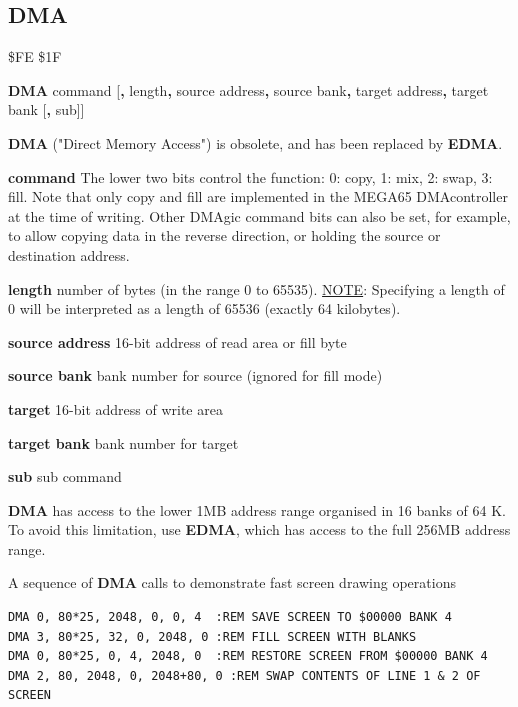 \subsection{DMA}
\label{BASIC 65 Commands!DMA}
\begin{description}[leftmargin=2cm,style=nextline]
\item [Token:] \$FE \$1F
\item [Format:] {\bf DMA} command [{\bf,} length{\bf,} source address{\bf,}
                 source bank{\bf,} target address{\bf,} target bank
                 [{\bf,} sub]]
\item [Usage:]
   {\bf DMA} ("Direct Memory Access") is obsolete,
   and has been replaced by {\bf EDMA}.

   {\bf command} The lower two bits control the function: 0: copy, 1: mix, 2: swap, 3: fill. Note that only copy and fill are implemented in the MEGA65 DMAcontroller at the time of writing.  Other DMAgic command bits can also be set, for example, to allow copying data in the reverse direction, or holding the source or destination address.

   {\bf length} number of bytes (in the range 0 to 65535). \underline{NOTE}: Specifying a length of 0 will be interpreted as a length of 65536 (exactly 64 kilobytes).

   {\bf source address} 16-bit address of read area or fill byte

   {\bf source bank} bank number for source (ignored for fill mode)

   {\bf target} 16-bit address of write area

   {\bf target bank} bank number for target

   {\bf sub} sub command

\item [Remarks:]
{\bf DMA} has access to the lower 1MB address range
organised in 16 banks of 64 K. To avoid this limitation, use
{\bf EDMA}, which has access to the full 256MB address range.

\item [Examples:] A sequence of {\bf DMA} calls to demonstrate fast screen drawing operations
\begin{tcolorbox}[colback=black,coltext=white]
\verbatimfont{\codefont}
\begin{verbatim}
DMA 0, 80*25, 2048, 0, 0, 4  :REM SAVE SCREEN TO $00000 BANK 4
DMA 3, 80*25, 32, 0, 2048, 0 :REM FILL SCREEN WITH BLANKS
DMA 0, 80*25, 0, 4, 2048, 0  :REM RESTORE SCREEN FROM $00000 BANK 4
DMA 2, 80, 2048, 0, 2048+80, 0 :REM SWAP CONTENTS OF LINE 1 & 2 OF SCREEN
\end{verbatim}
\end{tcolorbox}
\end{description}


